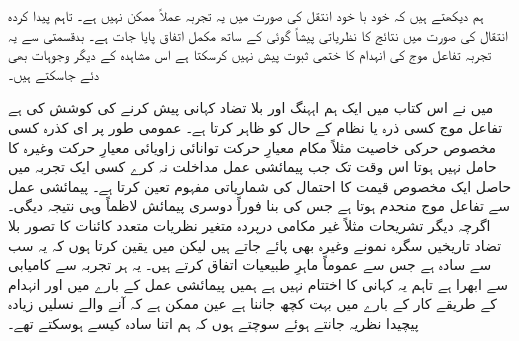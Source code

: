 ہم دیکھتے ہیں کہ خود با خود انتقل کی صورت میں یہ تجربہ عملاً ممکن نہیں ہے۔ تاہم پیدا کردہ انتقال کی صورت میں نتائج کا نظریاتی پیشاً گوئی کے ساتھ مکمل اتفاق پایا جات ہے۔ بدقسمتی سے یہ تجربہ تفاعل موج کی انہدام کا ختمی ثبوت پیش نہیں کرسکتا ہے اس مشاہدہ کے دیگر وجوہات بھی دئے جاسکتے ہیں۔ 

میں نے اس کتاب میں ایک ہم اہہنگ اور بلا تضاد کہانی پیش کرنے کی کوشش کی ہے تفاعل موج  کسی ذرہ یا نظام کے حال کو ظاہر کرتا ہے۔ عمومی طور پر ای کذرہ کسی مخصوص حرکی خاصیت مثلاً مکام معیارِ حرکت توانائی زاویائی معیارِ حرکت وغیرہ کا حامل نہیں ہوتا اس وقت تک  جب پیمائشی عمل مداخلت نہ کرے کسی ایک تجربہ میں حاصل ایک مخصوص قیمت کا احتمال  کی شماریاتی مفہوم تعین کرتا ہے۔ پیمائشی عمل سے تفاعل موج منحدم ہوتا ہے جس کی بنا فوراً دوسری پیمائش لاظماً وہی نتیجہ دیگی۔ اگرچہ دیگر تشریحات مثلاً غیر مکامی درپردہ متغیر نظریات متعدد کائنات کا تصور بلا تضاد تاریخیں سگرہ نمونے وغیرہ بھی پائے جاتے ہیں لیکن میں یقین کرتا ہوں کہ یہ سب سے سادہ ہے جس سے عموماً ماہرِ طبیعیات اتفاق کرتے ہیں۔ یہ ہر تجربہ سے کامیابی سے ابھرا ہے تاہم یہ کہانی کا اختتام نہیں ہے ہمیں پیمائشی عمل کے بارے میں اور انہدام کے طریقے کار کے بارے میں بہت کچھ جاننا ہے عین ممکن ہے کہ آنے والے نسلیں زیادہ پیچیدا نظریہ جانتے ہوئے سوچتے ہوں کہ ہم اتنا سادہ کیسے ہوسکتے تھے۔

